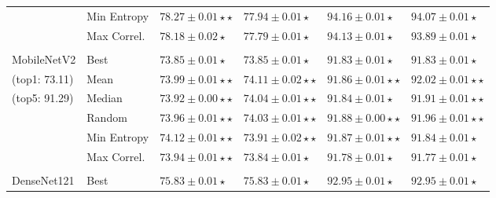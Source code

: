 \begin{table}[h!]
\begin{tabularx}{\textwidth}{XX|YY|YY}
									& Min Entropy              & $\mathbf{78.27\pm0.01\star\star}$    & $77.94\pm0.01\star$                  & $94.16\pm0.01\star$                 & $94.07\pm0.01\star$                 \\
									& Max Correl.              & $78.18\pm 0.02\star$                 & $77.79\pm0.01\star$                  & $94.13\pm0.01\star$                 & $93.89\pm0.01\star$                 \\
									&                          &                                      &                                      &                                     &                                     \\
	 { MobileNetV2}                 & Best                     & $73.85 \pm 0.01 \star$               & $73.85 \pm 0.01 \star$               & $91.83 \pm 0.01\star$               & $91.83 \pm 0.01\star$               \\
	 (top1: 73.11)                    & Mean                     & $73.99 \pm 0.01 \star\star$          & $\mathbf{74.11 \pm 0.02} \star\star$ & $91.86 \pm 0.01\star\star$          & $\mathbf{92.02 \pm 0.01\star\star}$ \\
	 (top5: 91.29)                    & Median                   & $73.92 \pm 0.00\star\star $          & $74.04 \pm 0.01 \star\star$          & $91.84 \pm 0.01\star$               & $91.91 \pm 0.01\star\star$          \\
									& Random                   & $73.96 \pm 0.01 \star\star$          & $74.03 \pm 0.01\star\star$           & $\mathbf{91.88 \pm 0.00\star\star}$ & $91.96 \pm 0.01\star\star$          \\
									& Min Entropy              & $\mathbf{74.12\pm0.01\star\star}$    & $73.91\pm0.02\star\star$             & $91.87\pm0.01\star\star$            & $91.84\pm0.01\star$                 \\
									& Max Correl.              & $73.94\pm0.01\star\star$             & $73.84\pm0.01\star$                  & $91.78\pm0.01\star$                 & $91.77\pm0.01\star$                 \\
									&                          &                                      &                                      &                                     &                                     \\
	 { DenseNet121}                 & Best                     & $ 75.83 \pm 0.01 \star$              & $ 75.83 \pm 0.01 \star$              & $92.95 \pm 0.01\star$               & $92.95 \pm 0.01 \star$              \\

\end{tabularx}
\end{table}
